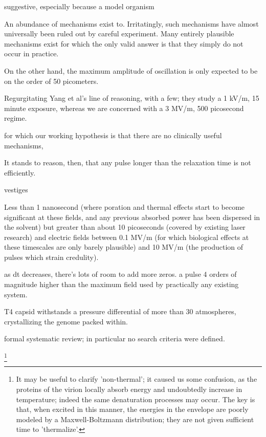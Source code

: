 \documentclass[paper.tex]{subfiles}
\begin{document}
\begin{multicols}{1}


suggestive, especially because a model organism

An abundance of mechanisms exist to. Irritatingly, such mechanisms have almost universally been ruled out by careful experiment. Many entirely plausible mechanisms exist for which the only valid answer is that they simply do not occur in practice.


On the other hand, the maximum amplitude of oscillation is only expected to be on the order of 50 picometers. 


Regurgitating Yang et al's line of reasoning, with a few; they study a 1 kV/m, 15 minute exposure, whereas we are concerned with a 3 MV/m, 500 picosecond regime. 


for which our working hypothesis is that there are no clinically useful mechanisms, 



It stands to reason, then, that any pulse longer than the relaxation time is not efficiently. 

vestiges

Less than 1 nanosecond (where poration and thermal effects start to become significant at these fields, and any previous absorbed power has been dispersed in the solvent) but greater than about 10 picoseconds (covered by existing laser research) and electric fields between 0.1 MV/m (for which biological effects at these timescales are only barely plausible) and 10 MV/m (the production of pulses which strain credulity).

as dt decreases, there's lots of room to add more zeros. a pulse 4 orders of magnitude higher than the maximum field used by practically any existing system.





T4 capsid withstands a pressure differential of more than 30 atmospheres, crystallizing the genome packed within. \cite{Osmotic2003}


formal systematic review; in particular no search criteria were defined.

%
\footnote{It may be useful to clarify 'non-thermal'; it caused us some confusion, as the proteins of the virion locally absorb energy and undoubtedly increase in temperature; indeed the same denaturation processes may occur. The key is that, when excited in this manner, the energies in the envelope are poorly modeled by a Maxwell-Boltzmann distribution; they are not given sufficient time to 'thermalize'.} 
%



\end{multicols}
\end{document}

